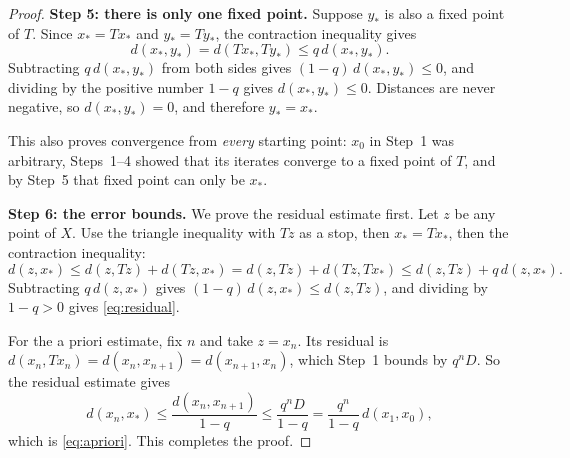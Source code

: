 \begin{proof}
\textbf{Step 5: there is only one fixed point.} Suppose $y_*$ is also a fixed point of $T$. Since $x_*=Tx_*$ and $y_*=Ty_*$, the contraction inequality gives
\[
d(x_*,y_*)=d(Tx_*,Ty_*)\le q\,d(x_*,y_*).
\]
Subtracting $q\,d(x_*,y_*)$ from both sides gives $(1-q)\,d(x_*,y_*)\le0$, and dividing by the positive number $1-q$ gives $d(x_*,y_*)\le0$. Distances are never negative, so $d(x_*,y_*)=0$, and therefore $y_*=x_*$.

This also proves convergence from \emph{every} starting point: $x_0$ in Step~1 was arbitrary, Steps~1--4 showed that its iterates converge to a fixed point of $T$, and by Step~5 that fixed point can only be $x_*$.

\textbf{Step 6: the error bounds.} We prove the residual estimate first. Let $z$ be any point of $X$. Use the triangle inequality with $Tz$ as a stop, then $x_*=Tx_*$, then the contraction inequality:
\[
d(z,x_*)\le d(z,Tz)+d(Tz,x_*)=d(z,Tz)+d(Tz,Tx_*)
\le d(z,Tz)+q\,d(z,x_*).
\]
Subtracting $q\,d(z,x_*)$ gives $(1-q)\,d(z,x_*)\le d(z,Tz)$, and dividing by $1-q>0$ gives \eqref{eq:residual}.

For the a priori estimate, fix $n$ and take $z=x_n$. Its residual is $d(x_n,Tx_n)=d(x_n,x_{n+1})=d(x_{n+1},x_n)$, which Step~1 bounds by $q^nD$. So the residual estimate gives
\[
d(x_n,x_*)\le\frac{d(x_n,x_{n+1})}{1-q}\le\frac{q^nD}{1-q}=\frac{q^n}{1-q}\,d(x_1,x_0),
\]
which is \eqref{eq:apriori}. This completes the proof.
\end{proof}

